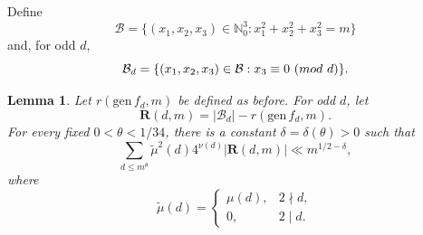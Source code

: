 \documentclass[10pt,a4paper]{amsart}
\numberwithin{equation}{section}
\def\pmod #1{\ ({\rm{mod}}\ #1)}
\newtheorem{lemma}{Lemma}
\begin{document}
Define
\[
\mathcal B=\{(x_1,x_2,x_3)\in\mathbb N_0^3:x_1^2+x_2^2+x_3^2=m\}
\]
and, for odd $d$,
\[
\mathcal B_d=\{(x_1,x_2,x_3)\in\mathcal B:x_3\equiv0\pmod d\}.
\]


\begin{lemma}\label{lem1}
Let $r(\mathrm{gen}\,f_d,m)$ be defined as before. For odd $d$, let
\[
\mathbf R(d,m)=|\mathcal B_d|-r(\mathrm{gen}\,f_d,m).
\]
For every fixed $0<\theta<1/34$, there is a constant $\delta=\delta(\theta)>0$ such that
\[
\sum_{d\leq m^\theta}\widetilde\mu^2(d)4^{\nu(d)}|\mathbf R(d,m)|
\ll m^{1/2-\delta},
\]
where
\[
\widetilde\mu(d)=
\begin{cases}
\mu(d),&2\nmid d,\\
0,&2\mid d.
\end{cases}
\]
\end{lemma}
\end{document}
